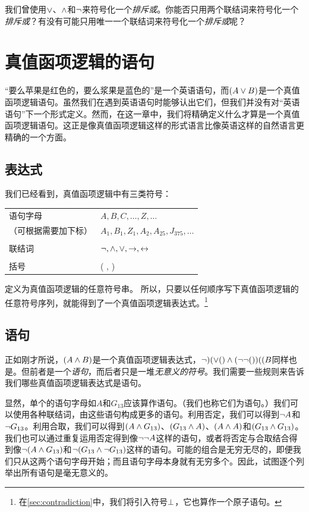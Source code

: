 \problempart
我们曾使用$\vee$、$\wedge$和$\neg$来符号化一个\emph{排斥或}。你能否只用两个联结词来符号化一个\emph{排斥或}？有没有可能只用唯一一个联结词来符号化一个\emph{排斥或}呢？

\chapter{真值函项逻辑的语句}\label{s:TFLSentences}
“要么苹果是红色的，要么浆果是蓝色的”是一个英语语句，而$(A\vee B)$是一个真值函项逻辑语句。虽然我们在遇到英语语句时能够认出它们，但我们并没有对“英语语句”下一个形式定义。然而，在这一章中，我们将精确定义什么才算是一个真值函项逻辑语句。这正是像真值函项逻辑这样的形式语言比像英语这样的自然语言更精确的一个方面。

\section{表达式}

我们已经看到，真值函项逻辑中有三类符号：


\begin{center}
\begin{tabular}{l l}
语句字母 & $A,B,C,\ldots,Z,\ldots$\\
（可根据需要加下标） & $A_1, B_1,Z_1,A_2,A_{25},J_{375},\ldots$\\
\\
联结词 & $\neg,\wedge,\vee,\rightarrow,\leftrightarrow$\\
\\
括号 &( , )\\
\end{tabular}
\end{center}


定义为真值函项逻辑的任意符号串。
所以，只要以任何顺序写下真值函项逻辑的任意符号序列，就能得到了一个真值函项逻辑表达式。\footnote{在\cref{sec:contradiction}中，我们将引入符号$\bot$，它也算作一个原子语句。}

\section{语句}\label{s:Sentences}
正如刚才所说，$(A \wedge B)$是一个真值函项逻辑表达式，$\lnot)(\vee()\wedge(\neg\neg())((B$同样也是。但前者是一个\emph{语句}，而后者只是一堆\emph{无意义的符号}。我们需要一些规则来告诉我们哪些真值函项逻辑表达式是语句。

显然，单个的语句字母如$A$和$G_{13}$应该算作语句。（我们也称它们为语句。）我们可以使用各种联结词，由这些语句构成更多的语句。利用否定，我们可以得到$\neg A$和$\neg G_{13}$。利用合取，我们可以得到$(A \wedge G_{13})$、$(G_{13} \wedge A)$、$(A \wedge A)$和$(G_{13} \wedge G_{13})$。我们也可以通过重复运用否定得到像$\neg \neg A$这样的语句，或者将否定与合取结合得到像$\neg(A \wedge G_{13})$和$\neg(G_{13} \wedge \neg G_{13})$这样的语句。可能的组合是无穷无尽的，即便我们只从这两个语句字母开始；而且语句字母本身就有无穷多个。因此，试图逐个列举出所有语句是毫无意义的。

